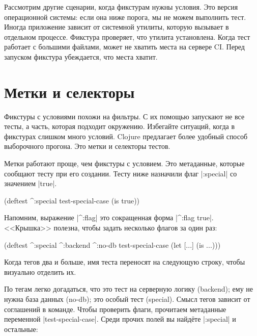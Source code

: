 Рассмотрим другие сценарии, когда фикстурам нужны условия. Это версия
операционной системы: если она ниже порога, мы не можем выполнить тест. Иногда
приложение зависит от системной утилиты, которую вызывает в отдельном
процессе. Фикстура проверяет, что утилита установлена. Когда тест работает с
большими файлами, может не хватить места на сервере CI. Перед запуском фикстура
убеждается, что места хватит.

\section{Метки и селекторы}


Фикстуры с условиями похожи на фильтры. С их помощью запускают не все тесты, а
часть, которая подходит окружению. Избегайте ситуаций, когда в фикстурах слишком
много условий. Clojure предлагает более удобный способ выборочного
прогона. Это метки и селекторы тестов.

Метки работают проще, чем фикстуры с условием. Это метаданные, которые сообщают
тесту при его создании. Тесту ниже назначили флаг \spverb|:special| со значением
\spverb|true|.

\begin{english}
  \begin{clojure}
(deftest ^:special test-special-case
  (is true))
  \end{clojure}
\end{english}


Напомним, выражение \spverb|^:flag| это сокращенная форма \spverb|^{:flag true}|.
<<Крышка>> полезна, чтобы задать несколько флагов за один раз:

\begin{english}
  \begin{clojure}
(deftest ^:special ^:backend ^:no-db
  test-special-case
  (let [...]
    (is ...)))
  \end{clojure}
\end{english}

Когда тегов два и больше, имя теста переносят на следующую строку, чтобы
визуально отделить их.

По тегам легко догадаться, что это тест на серверную логику (backend); ему не
нужна база данных (no-db); это особый тест (special). Смысл тегов зависит от
соглашений в команде. Чтобы проверить флаги, прочитаем метаданные переменной
\spverb|test-special-case|. Среди прочих полей вы найдёте \spverb|:special| и
остальные:

